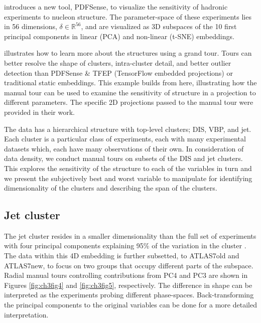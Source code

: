 \documentclass{template/monashthesis}
\begin{document}
\textcite{wang_mapping_2018} introduces a new tool, PDFSense, to visualize the sensitivity of hadronic experiments to nucleon structure. The parameter-space of these experiments lies in 56 dimensions, \(\delta \in \mathbb{R}^{56}\), and are visualized as 3D subspaces of the 10 first principal components in linear (PCA) and non-linear (t-SNE) embeddings.

\textcite{cook_dynamical_2018} illustrates how to learn more about the structures using a grand tour. Tours can better resolve the shape of clusters, intra-cluster detail, and better outlier detection than PDFSense \& TFEP (TensorFlow embedded projections) or traditional static embeddings. This example builds from here, illustrating how the manual tour can be used to examine the sensitivity of structure in a projection to different parameters. The specific 2D projections passed to the manual tour were provided in their work.

The data has a hierarchical structure with top-level clusters; DIS, VBP, and jet. Each cluster is a particular class of experiments, each with many experimental datasets which, each have many observations of their own. In consideration of data density, we conduct manual tours on subsets of the DIS and jet clusters. This explores the sensitivity of the structure to each of the variables in turn and we present the subjectively best and worst variable to manipulate for identifying dimensionality of the clusters and describing the span of the clusters.

\hypertarget{jet-cluster}{%
\subsection{Jet cluster}\label{jet-cluster}}

The jet cluster resides in a smaller dimensionality than the full set of experiments with four principal components explaining 95\% of the variation in the cluster \autocite{cook_dynamical_2018}. The data within this 4D embedding is further subsetted, to ATLAS7old and ATLAS7new, to focus on two groups that occupy different parts of the subspace. Radial manual tours controlling contributions from PC4 and PC3 are shown in Figures \ref{fig:ch3fig4} and \ref{fig:ch3fig5}, respectively. The difference in shape can be interpreted as the experiments probing different phase-spaces. Back-transforming the principal components to the original variables can be done for a more detailed interpretation.
\end{document}
